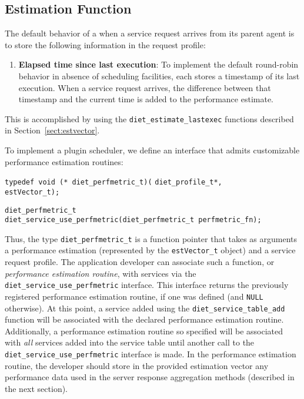 \subsection{Estimation Function}\label{sect:est_fn}

The default behavior of a {\sed} when a service request arrives from its parent
agent is to store the following information in the request profile:
\begin{enumerate}
\item \textbf{Elapsed time since last execution}: To implement the default
  round-robin behavior in absence of scheduling facilities, each {\sed}
  stores a timestamp of its last execution.  When a service request arrives,
  the difference between that timestamp and the current time is added to the
  performance estimate.
\end{enumerate}
This is accomplished by using the \texttt{diet\_estimate\_lastexec} functions
described in Section~\ref{sect:estvector}.

To implement a plugin scheduler, we define an interface that admits
customizable performance estimation routines:
\begin{tabbing}
  \texttt{typedef void (* diet\_perfmetric\_t)(}
    \=\texttt{diet\_profile\_t*,} \\
    \>\texttt{estVector\_t);} \\
\end{tabbing}
\begin{tabbing}
  \texttt{diet\_perfmetric\_t} \\
  \texttt{diet\_service\_use\_perfmetric(diet\_perfmetric\_t perfmetric\_fn);}\\
\end{tabbing}
Thus, the type \texttt{diet\_perfmetric\_t} is a function pointer that takes as
arguments a performance estimation (represented by the \texttt{estVector\_t}
object) and a \diet service request profile.  The application developer can
associate such a function, or \emph{performance estimation routine}, with \diet
services via the \texttt{diet\_service\_use\_perfmetric} interface.  This
interface returns the previously registered performance estimation routine, if
one was defined (and \texttt{NULL} otherwise).  At this point, a service added
using the \texttt{diet\_service\_table\_add} function will be associated with
the declared performance estimation routine.  Additionally, a performance
estimation routine so specified will be associated with \emph{all} services
added into the service table until another call to the
\texttt{diet\_service\_use\_perfmetric} interface is made.  In the performance
estimation routine, the {\sed} developer should store in the provided
estimation vector any performance data used in the server response aggregation
methods (described in the next section).

